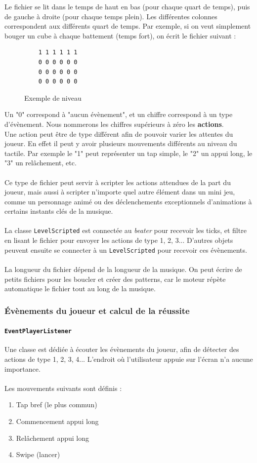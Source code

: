 Le fichier se lit dans le temps de haut en bas (pour chaque quart de temps), puis de gauche à droite (pour chaque temps plein). Les différentes colonnes correspondent aux différents quart de temps. Par exemple, si on veut simplement bouger un cube à chaque battement (temps fort), on écrit le fichier suivant :\\
\begin{figure}[!htb]
  \begin{lstlisting}
    1 1 1 1 1 1
    0 0 0 0 0 0
    0 0 0 0 0 0
    0 0 0 0 0 0
  \end{lstlisting}
\caption{Exemple de niveau}
\label{simple_level}
\end{figure}
Un "0" correspond à "aucun évènement", et un chiffre correspond à un type d'évènement. Nous nommerons les chiffres supérieurs à zéro les \textbf{actions}.
\\
Une action peut être de type différent afin de pouvoir varier les attentes du joueur. En effet il peut y avoir plusieurs mouvements différents au niveau du tactile. Par exemple le "1" peut représenter un tap simple, le "2" un appui long, le "3" un relâchement, etc.
\\\\
Ce type de fichier peut servir à scripter les actions attendues de la part du joueur, mais aussi à scripter n'importe quel autre élément dans un mini jeu, comme un personnage animé ou des déclenchements exceptionnels d'animations à certains instants clés de la musique.
\\\\
La classe \texttt{LevelScripted} est connectée au \textit{beater} pour recevoir les ticks, et filtre en lisant le fichier pour envoyer les actions de type 1, 2, 3... D'autres objets peuvent ensuite se connecter à un \texttt{LevelScripted} pour recevoir ces évènements.
\\\\
La longueur du fichier dépend de la longueur de la musique. On peut écrire de petits fichiers pour les boucler et créer des patterns, car le moteur répète automatique le fichier tout au long de la musique.

\subsubsection{Évènements du joueur et calcul de la réussite}
\paragraph{\texttt{EventPlayerListener}}
Une classe est dédiée à écouter les évènements du joueur, afin de détecter des actions de type 1, 2, 3, 4... L'endroit où l'utilisateur appuie sur l'écran n'a aucune importance.\\\\
Les mouvements suivants sont définis :
\begin{enumerate}
\item Tap bref (le plus commun)
\item Commencement appui long
\item Relâchement appui long
\item Swipe (lancer)
\end{enumerate}


